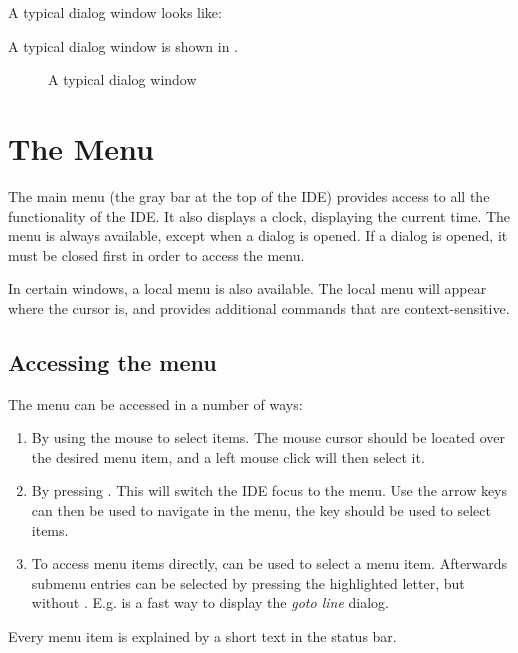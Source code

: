\begin{htmlonly}
A typical dialog window looks like:
\end{htmlonly}
\begin{latexonly}
A typical dialog window is shown in .
\begin{figure}
\caption{A typical dialog window}
\label{fig:idedlg}
\ifpdf
{}
\else
{}
\fi
\end{figure}
\end{latexonly}

\section{The Menu}
\label{se:idemenu}
The main menu (the gray bar at the top of the IDE) provides access to all the
functionality of the IDE. It also displays a clock, displaying the current
time. The menu is always available, except when a dialog is opened. If a
dialog is opened, it must be closed first in order to access the menu.

In certain windows, a local menu is also available. The local menu will
appear where the cursor is, and provides additional commands that are 
context-sensitive.
%
%
\subsection{Accessing the menu}
The menu can be accessed in a number of ways:
\begin{enumerate}
\item By using the mouse to select items. The mouse cursor should be located
over the desired menu item, and a left mouse click will then select it.
\item By pressing . This will switch the IDE focus to the menu. 
Use the arrow keys can then be used to navigate in the menu, the 
 key should be used to select items.
\item To access menu items directly, 
can be used to select a menu item. Afterwards submenu entries can be selected 
by pressing the highlighted letter, but without . 
E.g.  is a fast way to display the \emph{goto line} dialog.
\end{enumerate}
Every menu item is explained by a short text in the status bar.

